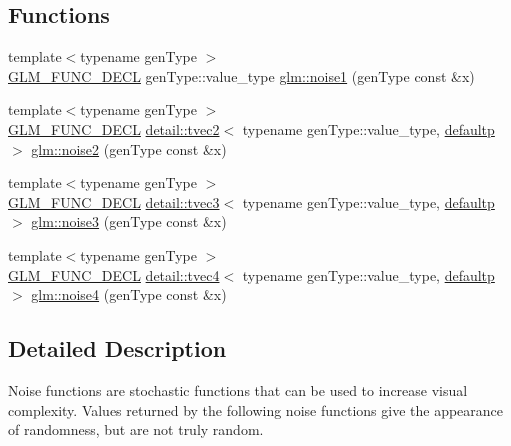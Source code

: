 \subsection*{Functions}
\begin{DoxyCompactItemize}
\item 
{\footnotesize template$<$typename gen\+Type $>$ }\\\hyperlink{setup_8hpp_ab2d052de21a70539923e9bcbf6e83a51}{G\+L\+M\+\_\+\+F\+U\+N\+C\+\_\+\+D\+E\+CL} gen\+Type\+::value\+\_\+type \hyperlink{group__core__func__noise_gadcbf14e3390990f33fda02bb20836960}{glm\+::noise1} (gen\+Type const \&x)
\item 
{\footnotesize template$<$typename gen\+Type $>$ }\\\hyperlink{setup_8hpp_ab2d052de21a70539923e9bcbf6e83a51}{G\+L\+M\+\_\+\+F\+U\+N\+C\+\_\+\+D\+E\+CL} \hyperlink{structglm_1_1detail_1_1tvec2}{detail\+::tvec2}$<$ typename gen\+Type\+::value\+\_\+type, \hyperlink{namespaceglm_a0f04f086094c747d227af4425893f545a9d21ccd8b5a009ec7eb7677befc3bf51}{defaultp} $>$ \hyperlink{group__core__func__noise_ga876ad0805cece7b52bac9f5bac42647a}{glm\+::noise2} (gen\+Type const \&x)
\item 
{\footnotesize template$<$typename gen\+Type $>$ }\\\hyperlink{setup_8hpp_ab2d052de21a70539923e9bcbf6e83a51}{G\+L\+M\+\_\+\+F\+U\+N\+C\+\_\+\+D\+E\+CL} \hyperlink{structglm_1_1detail_1_1tvec3}{detail\+::tvec3}$<$ typename gen\+Type\+::value\+\_\+type, \hyperlink{namespaceglm_a0f04f086094c747d227af4425893f545a9d21ccd8b5a009ec7eb7677befc3bf51}{defaultp} $>$ \hyperlink{group__core__func__noise_gadc066dd8e6c25b77a0dd4f59d4a2dd2c}{glm\+::noise3} (gen\+Type const \&x)
\item 
{\footnotesize template$<$typename gen\+Type $>$ }\\\hyperlink{setup_8hpp_ab2d052de21a70539923e9bcbf6e83a51}{G\+L\+M\+\_\+\+F\+U\+N\+C\+\_\+\+D\+E\+CL} \hyperlink{structglm_1_1detail_1_1tvec4}{detail\+::tvec4}$<$ typename gen\+Type\+::value\+\_\+type, \hyperlink{namespaceglm_a0f04f086094c747d227af4425893f545a9d21ccd8b5a009ec7eb7677befc3bf51}{defaultp} $>$ \hyperlink{group__core__func__noise_ga4ca7d36395a06c2f210ceca5d9a1d020}{glm\+::noise4} (gen\+Type const \&x)
\end{DoxyCompactItemize}


\subsection{Detailed Description}
Noise functions are stochastic functions that can be used to increase visual complexity. Values returned by the following noise functions give the appearance of randomness, but are not truly random. 

